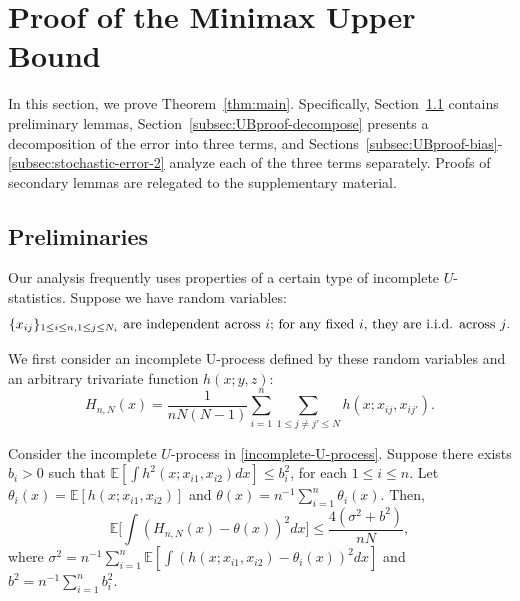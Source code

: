 \documentclass[preprint,11pt]{article}
\newtheorem{assumption}{Assumption}
\def\r#1{\textcolor{red}{\bf #1}}
\newcommand{\mbb}{\mathbb}
\numberwithin{equation}{section}
\newcommand{\beq}{\begin{equation}}
\newcommand{\eeq}{\end{equation}}
\begin{document}
\section{Proof of the Minimax Upper Bound}\label{sec:UBproof}








In this section, we prove Theorem~\ref{thm:main}. Specifically, Section~\ref{subsec:UBproof-preliminary} contains preliminary lemmas, 
Section~\ref{subsec:UBproof-decompose} presents a decomposition of the error into three terms, and Sections~\ref{subsec:UBproof-bias}-\ref{subsec:stochastic-error-2} analyze each of the three terms separately. 
Proofs of secondary lemmas are relegated to the supplementary material.







\subsection{Preliminaries}\label{subsec:UBproof-preliminary}
Our analysis frequently uses properties of a certain type of incomplete $U$-statistics. 
Suppose we have random variables:
\beq \label{x-rv}
\mbox{$ \{x_{ij}\}_{1\le i\le n,1\le j\le N_i}$ are independent across $i$; for any fixed $i$, they are i.i.d. across $j$}. 
\eeq

We first consider an incomplete U-process defined by these random variables and an arbitrary trivariate function $h(x; y,z)$:
\beq \label{incomplete-U-process}
    H_{n,N}(x)=\frac{1}{nN(N-1)}\sum_{i=1}^n\sum_{1\le j\neq j'\le N}h(x;x_{ij},x_{ij'}).
\eeq
\begin{lemma}\label{lem:uprocess-bound}
Consider the incomplete $U$-process in \eqref{incomplete-U-process}. 
Suppose there exists $b_i>0$ such that   $\mbb{E}[\int h^2(x;x_{i1},x_{i2})dx]\le b_i^2$, for each $1\leq i\leq n$.  Let $\theta_i(x)=\mbb{E}[h(x;x_{i1},x_{i2})]$ and $\theta(x)=n^{-1}\sum_{i=1}^{n}\theta_i(x)$. Then,  
    \[
        \mbb{E}\biggl[\int (H_{n,N}(x)-\theta(x))^2dx\biggr]\le \frac{4(\sigma^2+b^2)}{nN}, 
    \]
where $\sigma^2=n^{-1}\sum_{i=1}^{n}\mbb{E}\left[\int (h(x;x_{i1},x_{i2})-\theta_i(x))^2dx\right]$ and $b^2=n^{-1}\sum_{i=1}^n b_i^2$. 
\end{lemma}
\end{document}
